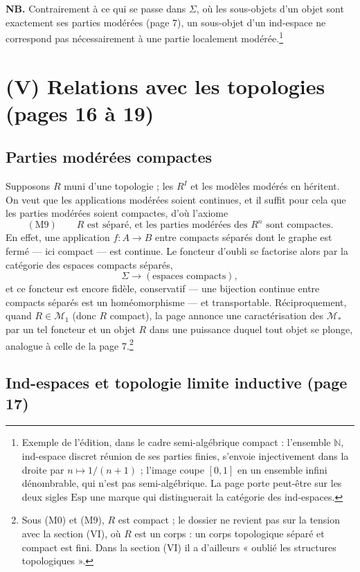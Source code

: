 \documentclass[11pt,a4paper]{article}
\begin{document}
\textbf{NB.} Contrairement à ce qui se passe dans $\Sigma$, où les sous-objets
d'un objet sont exactement ses parties modérées (page 7), un sous-objet d'un
ind-espace ne correspond pas nécessairement à une partie localement
modérée.\footnote{Exemple de l'édition, dans le cadre semi-algébrique
compact : l'ensemble $\mathbb{N}$, ind-espace discret réunion de ses parties
finies, s'envoie injectivement dans la droite par $n \mapsto 1/(n+1)$ ; l'image
coupe $[0,1]$ en un ensemble infini dénombrable, qui n'est pas semi-algébrique.
La page porte peut-être sur les deux sigles $\mathrm{Esp}$ une marque qui
distinguerait la catégorie des ind-espaces.}

\section*{(V) Relations avec les topologies (pages 16 à 19)}

\subsection*{Parties modérées compactes}

Supposons $R$ muni d'une topologie ; les $R^I$ et les modèles modérés en
héritent. On veut que les applications modérées soient continues, et il suffit
pour cela que les parties modérées soient compactes, d'où l'axiome
\[ (\mathrm{M}9) \qquad R \text{ est séparé, et les parties modérées des }
R^n \text{ sont compactes.} \]
En effet, une application $f : A \to B$ entre compacts séparés dont le graphe
est fermé — ici compact — est continue. Le foncteur d'oubli se factorise alors
par la catégorie des espaces compacts séparés,
\[ \Sigma \longrightarrow (\text{espaces compacts}) , \]
et ce foncteur est encore fidèle, conservatif — une bijection continue entre
compacts séparés est un homéomorphisme — et transportable. Réciproquement,
quand $R \in \mathcal{M}_1$ (donc $R$ compact), la page annonce une
caractérisation des $\mathcal{M}_*$ par un tel foncteur et un objet $R$ dans
une puissance duquel tout objet se plonge, analogue à celle de la page
7.\footnote{Sous (M0) et (M9), $R$ est compact ; le dossier ne revient pas
sur la tension avec la section (VI), où $R$ est un corps : un corps
topologique séparé et compact est fini. Dans la section (VI) il a d'ailleurs
« oublié les structures topologiques ».}

\subsection*{Ind-espaces et topologie limite inductive (page 17)}
\end{document}
